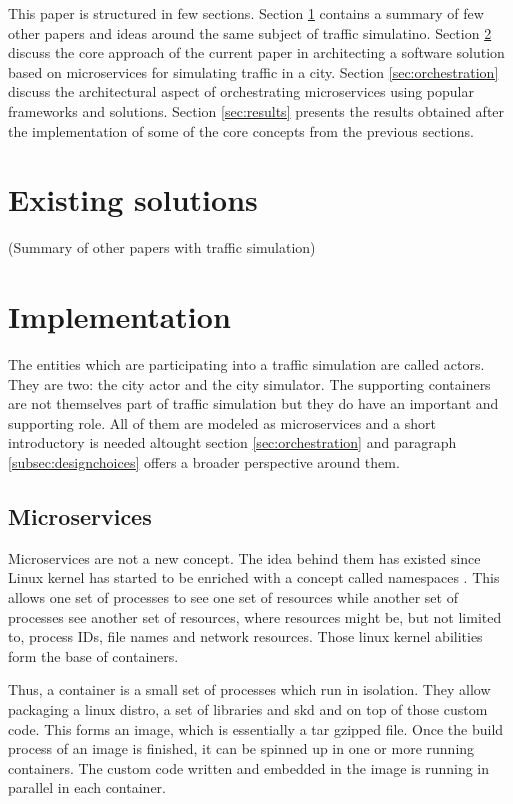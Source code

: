 \documentclass[conference]{IEEEtran}
\begin{document}
This paper is structured in few sections. Section \ref{sec:existingsolutions} contains a summary of few other papers and ideas around the same subject of traffic simulatino. Section \ref{sec:implementation} discuss the core approach of the current paper in architecting a software solution based on microservices for simulating traffic in a city. Section \ref{sec:orchestration} discuss the architectural aspect of orchestrating microservices using popular frameworks and solutions. Section \ref{sec:results} presents the results obtained after the implementation of some of the core concepts from the previous sections.

\section{Existing solutions}
\label{sec:existingsolutions}

(Summary of other papers with traffic simulation)

\section{Implementation}
\label{sec:implementation}

The entities which are participating into a traffic simulation are called actors. They are two: the city actor and the city simulator. The supporting containers are not themselves part of traffic simulation but they do have an important and supporting role. All of them are modeled as microservices and a short introductory is needed altought section \ref{sec:orchestration} and paragraph \ref{subsec:designchoices} offers a broader perspective around them.

\subsection{Microservices}

Microservices are not a new concept. The idea behind them has existed since Linux kernel has started to be enriched with a concept called namespaces \citep{wiki:linuxns}. This allows one set of processes to see one set of resources while another set of processes see another set of resources, where resources might be, but not limited to, process IDs, file names and network resources. Those linux kernel abilities form the base of containers.

Thus, a container is a small set of processes which run in isolation. They allow packaging a linux distro, a set of libraries and skd and on top of those custom code. This forms an image, which is essentially a tar gzipped file. Once the build process of an image is finished, it can be spinned up in one or more running containers. The custom code written and embedded in the image is running in parallel in each container.
\end{document}
